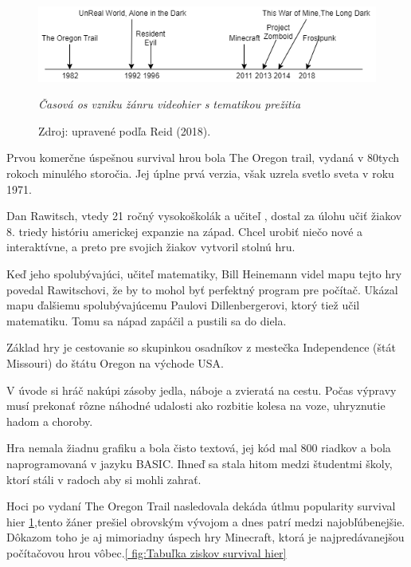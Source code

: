 \documentclass[10pt,oneoside,slovak,a4paper]{article}
\begin{document}
\begin{figure}[h]
	\begin{flushleft}
		
		\includegraphics[width=12.5cm,keepaspectratio]{diagram.png}
		\caption{\textit{Časová os vzniku žánru videohier s tematikou prežitia}}
		\label{ fig:Časová os vzniku žánru videohier s tematikou prežitia}
  		\caption*{Zdroj: upravené podľa Reid (2018). \cite{Reid}}
		
	\end{flushleft}
\end{figure}

Prvou komerčne úspešnou survival hrou bola The Oregon trail, vydaná v 80tych rokoch minulého storočia. Jej úplne prvá verzia, však uzrela svetlo sveta v roku 1971. 

Dan Rawitsch, vtedy 21 ročný vysokoškolák a učiteľ , dostal za úlohu učiť žiakov 8. triedy históriu americkej expanzie na západ. Chcel urobiť niečo nové a interaktívne, a preto pre svojich žiakov vytvoril stolnú hru. \cite{Toppo}

Keď jeho spolubývajúci, učiteľ matematiky,  Bill Heinemann videl mapu tejto hry povedal Rawitschovi, že by to mohol byť perfektný program pre počítač. Ukázal mapu ďalšiemu spolubývajúcemu Paulovi Dillenbergerovi, ktorý tiež učil matematiku. Tomu sa nápad zapáčil a pustili sa do diela. 

Základ hry je cestovanie so skupinkou osadníkov z mestečka Independence (štát Missouri) do štátu Oregon na východe  USA.

V úvode si hráč nakúpi zásoby jedla, náboje a zvieratá na cestu.  Počas výpravy musí prekonať rôzne náhodné udalosti ako rozbitie kolesa na voze, uhryznutie hadom a choroby.

Hra nemala žiadnu grafiku a bola čisto textová, jej kód mal 800 riadkov a bola naprogramovaná v jazyku BASIC. Ihneď sa stala hitom medzi študentmi školy, ktorí stáli v radoch aby si mohli zahrať. 

Hoci po vydaní The Oregon Trail nasledovala dekáda útlmu popularity survival hier \ref{ fig:Časová os vzniku žánru videohier s tematikou prežitia},tento žáner prešiel obrovským vývojom a dnes patrí medzi najobľúbenejšie. \cite{IGN}Dôkazom toho je aj mimoriadny úspech hry Minecraft, ktorá je najpredávanejšou počítačovou hrou vôbec.\ref{ fig:Tabuľka ziskov survival hier}
\end{document}
